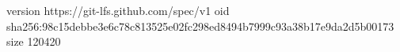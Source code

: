 version https://git-lfs.github.com/spec/v1
oid sha256:98c15debbe3e6c78c813525e02fc298ed8494b7999c93a38b17e9da2d5b00173
size 120420

